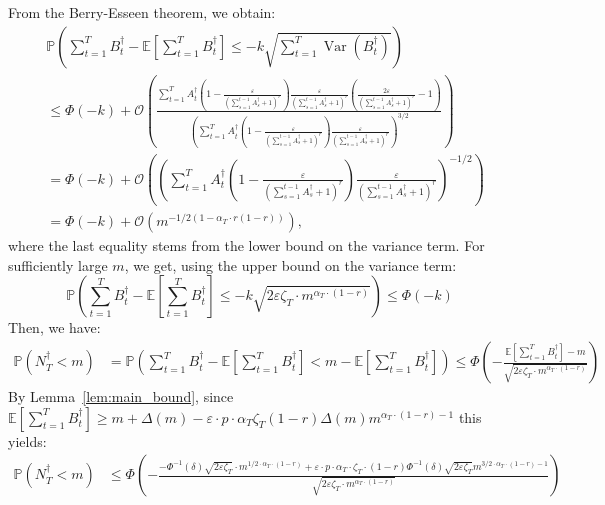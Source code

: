 \documentclass[nonblindrev]{informs3noheader}
\DeclareMathOperator{\Var}{Var}
\def\E{\mathbb{E}}
\def\P{\mathbb{P}}
\def\calO{\mathcal{O}}
\begin{document}
From the Berry-Esseen theorem, we obtain:
\begin{align*}
    &\P\left(\sum_{t=1}^T B^\dagger_t - \E\left[\sum_{t=1}^T B^\dagger_t\right] \leq -k\sqrt{\sum_{t=1}^T \Var(B^\dagger_t)}\right)\\
    &\leq \Phi(-k) + \calO\left(\frac{\sum_{t=1}^T A^\dagger_t \left(1 - \frac{\varepsilon}{\left(\sum_{s=1}^{t-1} A^\dagger_s +1\right)^r} \right) \frac{\varepsilon}{\left(\sum_{s=1}^{t-1} A^\dagger_s +1\right)^r} \left( \frac{2\varepsilon}{\left(\sum_{s=1}^{t-1} A^\dagger_s +1\right)^r} -1 \right)}{\left(\sum_{t=1}^T A^\dagger_t \left(1 - \frac{\varepsilon}{\left(\sum_{s=1}^{t-1} A^\dagger_s +1\right)^r} \right) \frac{\varepsilon}{\left(\sum_{s=1}^{t-1} A^\dagger_s +1\right)^r} \right)^{3/2}}\right) \\
    &= \Phi(-k) + \calO\left(\left(\sum_{t=1}^T A^\dagger_t \left(1 - \frac{\varepsilon}{\left(\sum_{s=1}^{t-1} A^\dagger_s +1\right)^r} \right) \frac{\varepsilon}{\left(\sum_{s=1}^{t-1} A^\dagger_s +1\right)^r} \right)^{-1/2}\right) \\
    &= \Phi(-k) + \calO\left(m^{-1/2\left(1-\alpha_T \cdot r(1-r)\right)}\right),
\end{align*}
where the last equality stems from the lower bound on the variance term. For sufficiently large $m$, we get, using the upper bound on the variance term:
\begin{equation}
    \P\left(\sum_{t=1}^T B^\dagger_t - \E\left[\sum_{t=1}^T B^\dagger_t\right] \leq -k\sqrt{2\varepsilon \zeta_T \cdot m^{\alpha_T \cdot (1-r)}}\right) \leq \Phi(-k) \label{eq:chernoff_bound}
\end{equation}
Then, we have:
\begin{align*}
    \P\left(N^\dagger_T<m\right)
    &=\P\left(\sum_{t=1}^T B^\dagger_t - \E\left[\sum_{t=1}^T B^\dagger_t\right] < m - \E\left[\sum_{t=1}^T B^\dagger_t\right]\right)
    \leq\Phi\left(-\frac{ \E\left[\sum_{t=1}^T B^\dagger_t\right]-m }{\sqrt{2 \varepsilon \zeta_T \cdot m^{\alpha_T \cdot (1-r)}}}\right)
\end{align*}
By Lemma~\ref{lem:main_bound}, since $\E\left[\sum_{t=1}^T B^\dagger_t\right]\geq m + \Delta(m)- \varepsilon\cdot p\cdot \alpha_T\zeta_T(1-r) \Delta(m)m^{\alpha_T \cdot (1-r)-1}$ this yields:
\begin{align*}
    \P\left(N^\dagger_T<m\right)
    &\leq \Phi\left(-\frac{-\Phi^{-1}(\delta)\sqrt{2 \varepsilon \zeta_T }\cdot m^{1/2\cdot \alpha_T \cdot (1-r)} + \varepsilon\cdot p\cdot \alpha_T\cdot\zeta_T\cdot(1-r)\Phi^{-1}(\delta) \sqrt{2\varepsilon \zeta_T} m^{3/2 \cdot \alpha_T \cdot (1-r)-1}}{\sqrt{2 \varepsilon \zeta_T \cdot m^{\alpha_T \cdot (1-r)}}}\right)
\end{align*}
\end{document}
